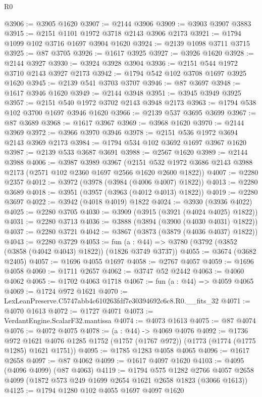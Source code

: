 \begin{lexlean}{R0}
\begin{coremodule}
@3906 := @3905 @1620
@3907 := @2144 @3906
@3909 := @3903 @3907 @3883
@3915 := @2151 @1101 @1972 @3718 @2143 @3906 @2173
@3921 := @1794 @1099 @102 @3716 @1697 @3904 @1620
@3924 := @2139 @1098 @3711 @3715
@3925 := @87 @3705
@3926 := @1617 @3925
@3927 := @3926 @1620
@3928 := @2144 @3927
@3930 := @3924 @3928 @3904
@3936 := @2151 @544 @1972 @3710 @2143 @3927 @2173
@3942 := @1794 @542 @102 @3708 @1697 @3925 @1620
@3945 := @2139 @541 @3703 @3707
@3946 := @87 @3697
@3948 := @1617 @3946 @1620
@3949 := @2144 @3948
@3951 := @3945 @3949 @3925
@3957 := @2151 @540 @1972 @3702 @2143 @3948 @2173
@3963 := @1794 @538 @102 @3700 @1697 @3946 @1620
@3966 := @2139 @537 @3695 @3699
@3967 := @87 @3689
@3968 := @1617 @3967
@3969 := @3968 @1620
@3970 := @2144 @3969
@3972 := @3966 @3970 @3946
@3978 := @2151 @536 @1972 @3694 @2143 @3969 @2173
@3984 := @1794 @534 @102 @3692 @1697 @3967 @1620
@3987 := @2139 @533 @3687 @3691
@3988 := @2567 @1620
@3989 := @2144 @3988
@4006 := @3987
    @3989
    @3967
    (@2151 @532 @1972 @3686 @2143 @3988 @2173 (@2571 @102 @2360 @1697 @2566 @1620 @2600 @1822))
@4007 := @2280 @2357
@4012 := @3972 (@3978 (@3984 (@4006 @4007) @1822))
@4013 := @2280 @3689
@4018 := @3951 (@3957 (@3963 (@4012 @4013) @1822))
@4019 := @2280 @3697
@4022 := @3942 (@4018 @4019) @1822
@4024 := @3930 (@3936 @4022)
@4025 := @2280 @3705
@4030 := @3909 (@3915 (@3921 (@4024 @4025) @1822))
@4031 := @2280 @3713
@4036 := @3888 (@3894 (@3900 (@4030 @4031) @1822))
@4037 := @2280 @3721
@4042 := @3867 (@3873 (@3879 (@4036 @4037) @1822))
@4043 := @2280 @3729
@4053 := fun (a : @44) => @3780 (@3792 (@3852 (@3858 (@4042 @4043) @1822)) (@1826 @3749 @3737))
@4055 := @3674 (@3682 @2405)
@4057 := @1696 @4055 @1697
@4058 := @2767 @4057
@4059 := @1696 @4058
@4060 := @1711 @2657
@4062 := @3747 @52 @2442
@4063 := @4060 @4062
@4065 := @1702 @4063 @1718
@4067 := fun (a : @44) => @4059 @4065
@4069 := @1724 @972 @1621
@4070 := LexLeanPreserve.C5747abb4c610263fdf7e30394692c6c8.R0.__fits_32
@4071 := @4070 @1613
@4072 := @1727 @4071
@4073 := VerdantEngine.ScalarF32.mantissa
@4074 := @4073 @1613
@4075 := @87 @4074
@4076 := @4072 @4075
@4078 := (a : @44) -> @4069 @4076
@4092 := @1736
    @972
    @1621
    @4076
    @1285
    @1752
    (@1757 (@1767 @972))
    (@1773 (@1774 (@1775 @1285) @1621 @1751))
@4095 := @1785 @1283 @4058 @4065
@4096 := @1617 @2658
@4097 := @87 @4062
@4099 := @1617 @4097 @1620
@4103 := @4095 (@4096 @4099) (@87 @4063)
@4119 := @1794
    @575
    @1282
    @2766
    @4057
    @2658
    @4099
    (@1872 @573 @249 @1699 @2654 @1621 @2658 @1823 (@3066 @1613))
@4125 := @1794 @1280 @102 @4055 @1697 @4097 @1620

\end{coremodule}
\end{lexlean}
